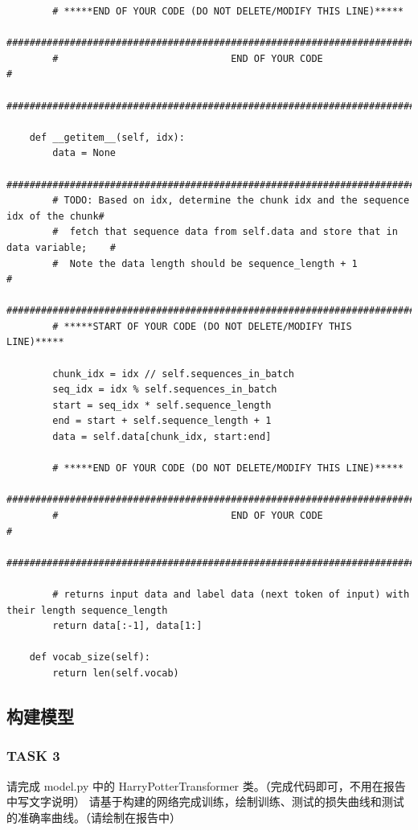 \documentclass{article}%
\begin{document}
\begin{lstlisting}
        # *****END OF YOUR CODE (DO NOT DELETE/MODIFY THIS LINE)*****
        ################################################################################
        #                              END OF YOUR CODE                                #
        ################################################################################
        
    def __getitem__(self, idx):
        data = None
        ################################################################################
        # TODO: Based on idx, determine the chunk idx and the sequence idx of the chunk#
        #  fetch that sequence data from self.data and store that in data variable;    #
        #  Note the data length should be sequence_length + 1                          #
        ################################################################################
        # *****START OF YOUR CODE (DO NOT DELETE/MODIFY THIS LINE)*****

        chunk_idx = idx // self.sequences_in_batch
        seq_idx = idx % self.sequences_in_batch
        start = seq_idx * self.sequence_length
        end = start + self.sequence_length + 1
        data = self.data[chunk_idx, start:end]

        # *****END OF YOUR CODE (DO NOT DELETE/MODIFY THIS LINE)*****
        ################################################################################
        #                              END OF YOUR CODE                                #
        ################################################################################

        # returns input data and label data (next token of input) with their length sequence_length
        return data[:-1], data[1:]

    def vocab_size(self):
        return len(self.vocab)
\end{lstlisting}

\subsection{构建模型}
\subsubsection{TASK 3}
请完成 model.py 中的 HarryPotterTransformer 类。（完成代码即可，不用在报告中写文字说明）
请基于构建的网络完成训练，绘制训练、测试的损失曲线和测试的准确率曲线。（请绘制在报告中）
\end{document}
